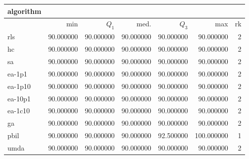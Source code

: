 \begin{tabular}{@{}l*{5}{>{{}}N{3}{0}}>{{}}N{2}{0}@{}}
\toprule
{algorithm} &  \\
\midrule
& {min} & {$Q_1$} & {med.} & {$Q_3$} & {max} & {rk}\\
\midrule
rls & {\color{blue}} 90.000000 & {\color{blue}} 90.000000 & {\color{blue}} 90.000000 & 90.000000 & 90.000000 & 2\\
hc & {\color{blue}} 90.000000 & {\color{blue}} 90.000000 & {\color{blue}} 90.000000 & 90.000000 & 90.000000 & 2\\
sa & {\color{blue}} 90.000000 & {\color{blue}} 90.000000 & {\color{blue}} 90.000000 & 90.000000 & 90.000000 & 2\\
ea-1p1 & {\color{blue}} 90.000000 & {\color{blue}} 90.000000 & {\color{blue}} 90.000000 & 90.000000 & 90.000000 & 2\\
ea-1p10 & {\color{blue}} 90.000000 & {\color{blue}} 90.000000 & {\color{blue}} 90.000000 & 90.000000 & 90.000000 & 2\\
ea-10p1 & {\color{blue}} 90.000000 & {\color{blue}} 90.000000 & {\color{blue}} 90.000000 & 90.000000 & 90.000000 & 2\\
ea-1c10 & {\color{blue}} 90.000000 & {\color{blue}} 90.000000 & {\color{blue}} 90.000000 & 90.000000 & 90.000000 & 2\\
ga & {\color{blue}} 90.000000 & {\color{blue}} 90.000000 & {\color{blue}} 90.000000 & 90.000000 & 90.000000 & 2\\
pbil & {\color{blue}} 90.000000 & {\color{blue}} 90.000000 & {\color{blue}} 90.000000 & {\color{blue}} 92.500000 & {\color{blue}} 100.000000 & 1\\
umda & {\color{blue}} 90.000000 & {\color{blue}} 90.000000 & {\color{blue}} 90.000000 & 90.000000 & 90.000000 & 2\\
\bottomrule
\end{tabular}
